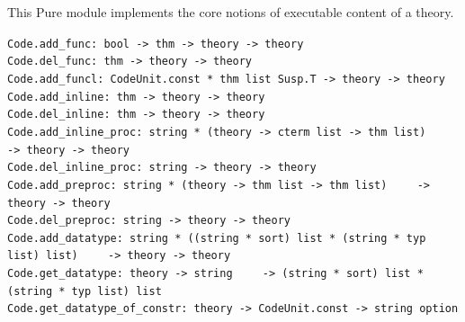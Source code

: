 \begin{isabellebody}
\begin{isamarkuptext}
\begin{description}
  \end{description}%
\end{isamarkuptext}%
\isamarkuptrue%
%
\endisatagmlref
{\isafoldmlref}%
%
\isadelimmlref
%
\endisadelimmlref
%
\isamarkuptrue%
%
\begin{isamarkuptext}%
This Pure module implements the core notions of
  executable content of a theory.%
\end{isamarkuptext}%
\isamarkuptrue%
%
\isamarkuptrue%
%
\isadelimmlref
%
\endisadelimmlref
%
\isatagmlref
%
\begin{isamarkuptext}%
\begin{mldecls}
  \verb|Code.add_func: bool -> thm -> theory -> theory| \\
  \verb|Code.del_func: thm -> theory -> theory| \\
  \verb|Code.add_funcl: CodeUnit.const * thm list Susp.T -> theory -> theory| \\
  \verb|Code.add_inline: thm -> theory -> theory| \\
  \verb|Code.del_inline: thm -> theory -> theory| \\
  \verb|Code.add_inline_proc: string * (theory -> cterm list -> thm list)|\isasep\isanewline%
\verb|    -> theory -> theory| \\
  \verb|Code.del_inline_proc: string -> theory -> theory| \\
  \verb|Code.add_preproc: string * (theory -> thm list -> thm list)|\isasep\isanewline%
\verb|    -> theory -> theory| \\
  \verb|Code.del_preproc: string -> theory -> theory| \\
  \verb|Code.add_datatype: string * ((string * sort) list * (string * typ list) list)|\isasep\isanewline%
\verb|    -> theory -> theory| \\
  \verb|Code.get_datatype: theory -> string|\isasep\isanewline%
\verb|    -> (string * sort) list * (string * typ list) list| \\
  \verb|Code.get_datatype_of_constr: theory -> CodeUnit.const -> string option|
  \end{mldecls}


\end{isamarkuptext}
\end{isabellebody}
